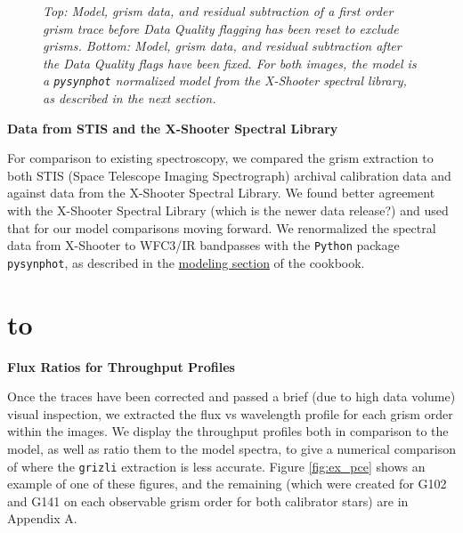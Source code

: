 \documentclass[12pt]{article}
\def\ssectionstar#1{\section*{\hbox to \hsize{\large\bf #1\hfill}}}
\begin{document}
{{\begin{figure}[h!]
\caption{\textit{Top: Model, grism data, and residual subtraction of a first order grism trace before Data Quality flagging 
    has been reset to exclude grisms. Bottom: Model, grism data, and residual subtraction after the Data Quality flags
    have been fixed. For both images, the model is a \texttt{pysynphot} normalized model from the X-Shooter spectral library, 
    as described in the next section.}}
\label{fig:beam_trace}
\end{figure}

{\bf Data from STIS and the X-Shooter Spectral Library}

For comparison to existing spectroscopy, we compared the grism extraction to both STIS (Space Telescope Imaging Spectrograph) 
archival calibration data and against data from the X-Shooter Spectral Library. We found better agreement with the X-Shooter
Spectral Library (which is the newer data release?) and used that for our model comparisons moving forward. We renormalized
the spectral data from X-Shooter to WFC3/IR bandpasses with the \texttt{Python} package \texttt{pysynphot}, as described in the
\href{http://grizli-calibration.readthedocs.io/en/latest/objects_models_outputs.html#creating-next-level-models-with-multibeam}{
    \color{blue} modeling section} of the cookbook. 

}

\ssectionstar{Analysis}
\normalsize{

{\bf Flux Ratios for Throughput Profiles}

Once the traces have been corrected and passed a brief (due to high data volume) visual inspection, we extracted 
the flux vs wavelength profile for each grism order within the images. We display the throughput profiles both in comparison
to the model, as well as ratio them to the model spectra, to give a numerical comparison of where the \texttt{grizli} extraction
is less accurate. Figure \ref{fig:ex_pce} shows an example of one of these figures, and the remaining (which were created
for G102 and G141 on each observable grism order for both calibrator stars) are in Appendix A. 

}}
\end{document}
